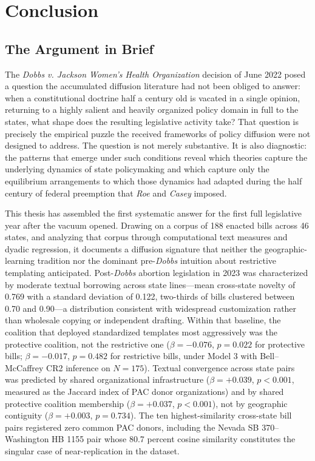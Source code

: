 \chapter{Conclusion}
\label{ch:conclusion}
 
\section{The Argument in Brief}
 
The \textit{Dobbs v. Jackson Women's Health Organization} decision of June 2022 posed a question the accumulated diffusion literature had not been obliged to answer: when a constitutional doctrine half a century old is vacated in a single opinion, returning to a highly salient and heavily organized policy domain in full to the states, what shape does the resulting legislative activity take? That question is precisely the empirical puzzle the received frameworks of policy diffusion were not designed to address. The question is not merely substantive. It is also diagnostic: the patterns that emerge under such conditions reveal which theories capture the underlying dynamics of state policymaking and which capture only the equilibrium arrangements to which those dynamics had adapted during the half century of federal preemption that \textit{Roe} and \textit{Casey} imposed.
 
This thesis has assembled the first systematic answer for the first full legislative year after the vacuum opened. Drawing on a corpus of 188 enacted bills across 46 states, and analyzing that corpus through computational text measures and dyadic regression, it documents a diffusion signature that neither the geographic-learning tradition nor the dominant pre-\textit{Dobbs} intuition about restrictive templating anticipated. Post-\textit{Dobbs} abortion legislation in 2023 was characterized by moderate textual borrowing across state lines---mean cross-state novelty of 0.769 with a standard deviation of 0.122, two-thirds of bills clustered between 0.70 and 0.90---a distribution consistent with widespread customization rather than wholesale copying or independent drafting. Within that baseline, the coalition that deployed standardized templates most aggressively was the protective coalition, not the restrictive one ($\beta = -0.076$, $p = 0.022$ for protective bills; $\beta = -0.017$, $p = 0.482$ for restrictive bills, under Model 3 with Bell--McCaffrey CR2 inference on $N = 175$). Textual convergence across state pairs was predicted by shared organizational infrastructure ($\beta = +0.039$, $p < 0.001$, measured as the Jaccard index of PAC donor organizations) and by shared protective coalition membership ($\beta = +0.037$, $p < 0.001$), not by geographic contiguity ($\beta = +0.003$, $p = 0.734$). The ten highest-similarity cross-state bill pairs registered zero common PAC donors, including the Nevada SB 370--Washington HB 1155 pair whose 80.7 percent cosine similarity constitutes the singular case of near-replication in the dataset.
 
